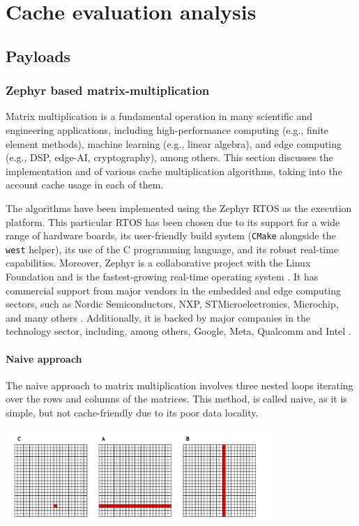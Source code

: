 
\chapter{Cache evaluation analysis}

\section{Payloads}

\subsection{Zephyr based matrix-multiplication}

Matrix multiplication is a fundamental operation in many scientific and engineering applications, including high-performance computing (e.g., finite element methods), machine
learning (e.g., linear algebra), and edge computing (e.g., DSP, edge-AI, cryptography), among others. This section discusses the implementation and of various cache multiplication algorithms,
taking into the account cache usage in each of them.

The algorithms have been implemented using the Zephyr RTOS as the execution platform. This particular RTOS has been chosen due to its support for a wide range of hardware boards,
its user-friendly build system (\texttt{CMake} alongside the \texttt{west} helper), its use of the C programming language, and its robust real-time capabilities.
Moreover, Zephyr is a collaborative project with the Linux Foundation and is the fastest-growing real-time operating system \cite{zephyrlotsofcommits}. It has commercial support
from major vendors in the embedded and edge computing sectors, such as Nordic Semiconductors, NXP, STMicroelectronics, Microchip, and many others \cite{aboutzephyr}. Additionally,
it is backed by major companies in the technology sector, including, among others, Google, Meta, Qualcomm and Intel \cite{zephyrmetagoogle, zephyrmembers}.

\subsubsection{Naive approach}
The naive approach to matrix multiplication involves three nested loops iterating over the rows and columns of the matrices. This method, is called naive, as it is simple, but not cache-friendly
due to its poor data locality.

\begin{center}
	\centering
	\includegraphics[width=0.75\textwidth]{figures/05-analysis/mm_naive.pdf}
	\label{fig:mm_naive}
\end{center}

